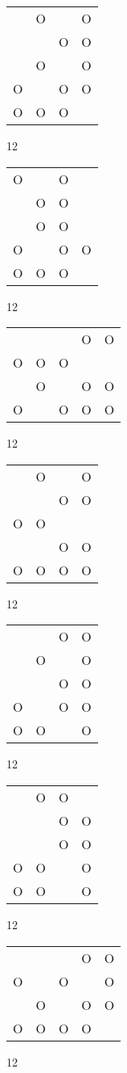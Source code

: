 \begin{tabular}{|m{0.2cm}m{0.2cm}m{0.2cm}m{0.2cm}|}\hline
 &O& &O\\
 & &O&O\\
 &O& &O\\
O& &O&O\\
O&O&O& \\
\hline\end{tabular}12
\begin{tabular}{|m{0.2cm}m{0.2cm}m{0.2cm}m{0.2cm}|}\hline
O& &O& \\
 &O&O& \\
 &O&O& \\
O& &O&O\\
O&O&O& \\
\hline\end{tabular}12
\begin{tabular}{|m{0.2cm}m{0.2cm}m{0.2cm}m{0.2cm}m{0.2cm}|}\hline
 & & &O&O\\
O&O&O& & \\
 &O& &O&O\\
O& &O&O&O\\
\hline\end{tabular}12
\begin{tabular}{|m{0.2cm}m{0.2cm}m{0.2cm}m{0.2cm}|}\hline
 &O& &O\\
 & &O&O\\
O&O& & \\
 & &O&O\\
O&O&O&O\\
\hline\end{tabular}12
\begin{tabular}{|m{0.2cm}m{0.2cm}m{0.2cm}m{0.2cm}|}\hline
 & &O&O\\
 &O& &O\\
 & &O&O\\
O& &O&O\\
O&O& &O\\
\hline\end{tabular}12
\begin{tabular}{|m{0.2cm}m{0.2cm}m{0.2cm}m{0.2cm}|}\hline
 &O&O& \\
 & &O&O\\
 & &O&O\\
O&O& &O\\
O&O& &O\\
\hline\end{tabular}12
\begin{tabular}{|m{0.2cm}m{0.2cm}m{0.2cm}m{0.2cm}m{0.2cm}|}\hline
 & & &O&O\\
O& &O& &O\\
 &O& &O&O\\
O&O&O&O& \\
\hline\end{tabular}12
